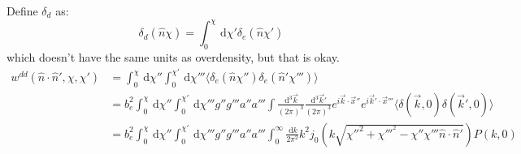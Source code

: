 \documentclass[onecolumn,prd,nofootinbib]{revtex4-1}
\newcommand{\ud}{\,\mathrm{d}}
\begin{document}
Define $\delta_d$ as:
\begin{equation}
    \delta_d(\hat n \chi) = \int_0^\chi \ud \chi' \delta_e(\hat n \chi')
\end{equation}
which doesn't have the same units as overdensity, but that is okay.
\begin{align}
    w^{dd}(\hat n \cdot \hat n', \chi, \chi')
    &= \int_0^\chi \ud \chi'' \int_0^{\chi'} \ud \chi'''
         \langle \delta_e(\hat n \chi'') \delta_e(\hat n' \chi''') \rangle\\
    &= b_e^2\int_0^\chi \ud \chi'' \int_0^{\chi'} \ud \chi'''
        g''g'''a''a'''
        \int\frac{\ud^3\vec k}{(2 \pi)^3} \frac{\ud^3\vec k'}{(2 \pi)^3}
        e^{i\vec k \cdot \vec x''} e^{i\vec k' \cdot \vec x'''}
        \langle \delta(\vec k, 0) \delta(\vec k', 0) \rangle\\
    &= b_e^2\int_0^\chi \ud \chi'' \int_0^{\chi'} \ud \chi'''
        g''g'''a''a'''
        \int_0^\infty\frac{\ud k}{2 \pi^2} k^2
        j_0 (k \sqrt{\chi''^2 + \chi'''^{^2} - \chi'' \chi''' \hat n \cdot \hat n'})
        P(k, 0)
\end{align}
\end{document}
